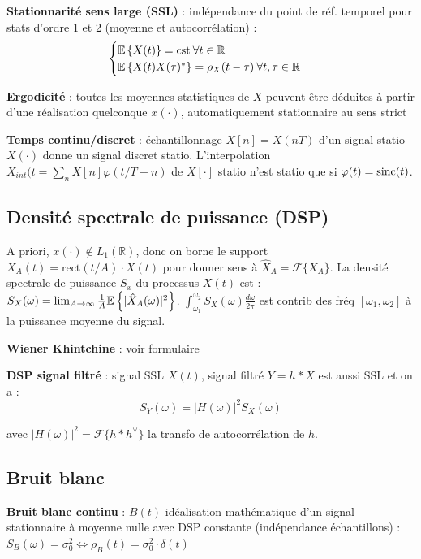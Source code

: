 \textbf{Stationnarité sens large (SSL)} : indépendance du point de réf. temporel pour stats d'ordre 1 et 2 (moyenne et autocorrélation) : 
\[ \begin{cases}
\mathbb{E}\left\{X(t)\right\} = \text{cst}\:\forall t\in\mathbb{R} \\
\mathbb{E}\left\{X(t)X(\tau)^*\right\} = \rho_X(t-\tau)\:\forall t,\tau\in\mathbb{R}
\end{cases}\]

\textbf{Ergodicité} : toutes les moyennes statistiques de $X$ peuvent être déduites à partir d'une réalisation quelconque $x(\cdot)$, automatiquement stationnaire au sens strict

\textbf{Temps continu/discret} : échantillonnage $X[n]=X(nT)$ d'un signal statio $X(\cdot)$ donne un signal discret statio. L'interpolation $X_{int}(t = \sum_n X[n] \varphi(t/T-n)$ de $X[\cdot]$ statio n'est statio que si $\varphi(t) = \operatorname{sinc}(t)$.

\subsection*{Densité spectrale de puissance (DSP)}
A priori, $x(\cdot) \notin L_1(\mathbb{R})$, donc on borne le support $X_A(t) = \text{rect}(t/A)\cdot X(t)$ pour donner sens à $\hat X_A=\mathcal{F}\{X_A\}$. La densité spectrale de puissance $S_x$ du processus $X(t)$ est : $S_X(\omega) = \lim_{A\rightarrow\infty} \frac{1}{A}\mathbb{E}\left\{|\hat X_A(\omega)|^2\right\}$. $\int_{\omega_1}^{\omega_2} S_X(\omega) \frac{d\omega}{2\pi}$ est contrib des fréq $[\omega_1,\omega_2]$ à la puissance moyenne du signal.

\textbf{Wiener Khintchine} : voir formulaire

\textbf{DSP signal filtré} : signal SSL $X(t)$, signal filtré $Y=h*X$ est aussi SSL et on a : 
\begin{equation*}
    S_Y(\omega) = |H(\omega)|^2 S_X(\omega)
\end{equation*}

avec $|H(\omega)|^2 = \mathcal{F}\{h*h^\vee\}$ la transfo de autocorrélation de $h$.

\subsection*{Bruit blanc}

\textbf{Bruit blanc continu} : $B(t)$ idéalisation mathématique d'un signal stationnaire à moyenne nulle avec DSP constante (indépendance échantillons) : $S_B(\omega) = \sigma_0^2 \Leftrightarrow \rho_B(t) = \sigma_0^2 \cdot \delta(t)$

